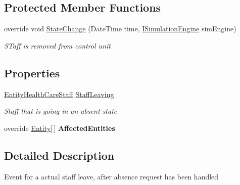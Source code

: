\subsection*{Protected Member Functions}
\begin{DoxyCompactItemize}
\item 
override void \hyperlink{class_general_health_care_elements_1_1_staff_handling_1_1_event_staff_leave_a121326f730815b3d0dd71ff8a506437f}{State\+Change} (Date\+Time time, \hyperlink{interface_simulation_core_1_1_simulation_classes_1_1_i_simulation_engine}{I\+Simulation\+Engine} sim\+Engine)
\begin{DoxyCompactList}\small\item\em S\+Taff is removed from control unit \end{DoxyCompactList}\end{DoxyCompactItemize}
\subsection*{Properties}
\begin{DoxyCompactItemize}
\item 
\hyperlink{class_general_health_care_elements_1_1_entities_1_1_entity_health_care_staff}{Entity\+Health\+Care\+Staff} \hyperlink{class_general_health_care_elements_1_1_staff_handling_1_1_event_staff_leave_a6fce1b988dd5760d83eba97efdfe9b14}{Staff\+Leaving}
\begin{DoxyCompactList}\small\item\em Staff that is going in an absent state \end{DoxyCompactList}\item 
override \hyperlink{class_simulation_core_1_1_h_c_c_m_elements_1_1_entity}{Entity}\mbox{[}$\,$\mbox{]} {\bfseries Affected\+Entities}\hypertarget{class_general_health_care_elements_1_1_staff_handling_1_1_event_staff_leave_a3bb40dad58d6480dfcf7843e02b5f2ab}{}\label{class_general_health_care_elements_1_1_staff_handling_1_1_event_staff_leave_a3bb40dad58d6480dfcf7843e02b5f2ab}

\end{DoxyCompactItemize}


\subsection{Detailed Description}
Event for a actual staff leave, after absence request has been handled 



